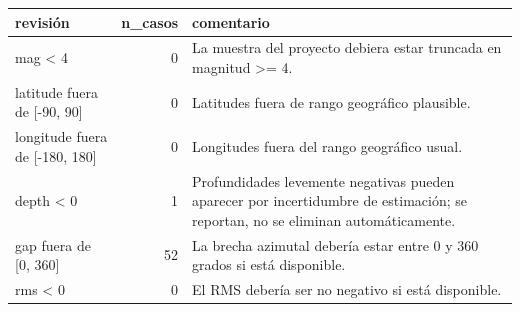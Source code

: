 \begin{tabular}{lrl}
\toprule
revisión & n\_casos & comentario \\
\midrule
mag < 4 & 0 & La muestra del proyecto debiera estar truncada en magnitud >= 4. \\
latitude fuera de [-90, 90] & 0 & Latitudes fuera de rango geográfico plausible. \\
longitude fuera de [-180, 180] & 0 & Longitudes fuera del rango geográfico usual. \\
depth < 0 & 1 & Profundidades levemente negativas pueden aparecer por incertidumbre de estimación; se reportan, no se eliminan automáticamente. \\
gap fuera de [0, 360] & 52 & La brecha azimutal debería estar entre 0 y 360 grados si está disponible. \\
rms < 0 & 0 & El RMS debería ser no negativo si está disponible. \\
\bottomrule
\end{tabular}
